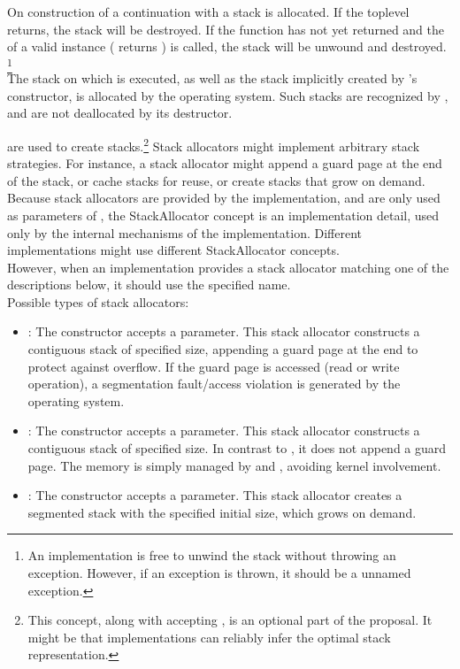 \label{subsec:destruction}
On construction of a continuation with \call a stack is allocated. If the
toplevel \entryfn returns, the stack will be destroyed. If the function has not
yet returned and the  of a valid \cont instance (\opbool
returns ) is called, the stack will be unwound and destroyed.
\footnote{An implementation is free to unwind the stack without throwing an
exception. However, if an exception is thrown, it should be a unnamed
exception.}\\
The stack on which  is executed, as well as the stack implicitly
created by 's constructor, is allocated by the operating
system. Such stacks are recognized by \cont, and are not deallocated by its
destructor.


\label{subsec:stackalloc}
are used to create stacks.\footnote{This concept, along with \call accepting
, is an optional part of the proposal. It might be
that implementations can reliably infer the optimal stack representation.}
Stack allocators might implement arbitrary stack strategies. For instance, a
stack allocator might append a guard page at the end of the stack, or cache
stacks for reuse, or create stacks that grow on demand.\\
Because stack allocators are provided by the implementation, and are only used
as parameters of \call, the StackAllocator concept is an implementation detail,
used only by the internal mechanisms of the \cc implementation. Different
implementations might use different StackAllocator concepts.\\
However, when an implementation provides a stack allocator matching one of
the descriptions below, it should use the specified name.\\
Possible types of stack allocators:
\begin{itemize}
    \item {}: The constructor accepts a 
        parameter. This stack allocator constructs a contiguous stack of
        specified size, appending a guard page at the end to protect against
        overflow. If the guard page is accessed (read or write operation), a
        segmentation fault/access violation is generated by the operating
        system.
    \item {}: The constructor accepts a  parameter.
        This stack allocator constructs a contiguous stack of specified size.
        In contrast to , it does not append a guard
        page. The memory is simply managed by 
        and , avoiding kernel involvement.
    \item {}: The constructor accepts a  parameter.
        This stack allocator creates a segmented stack with the specified
        initial size, which grows on demand.
\end{itemize}


